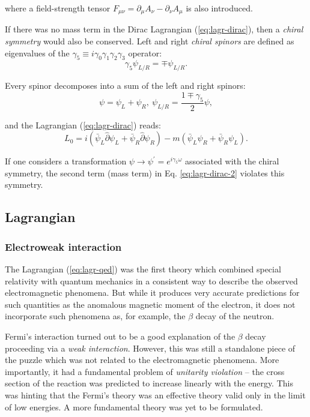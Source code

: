 where a field-strength tensor $F_{\mu\nu} = \partial_\mu A_\nu - \partial_\nu A_\mu$ is also introduced.

If there was no mass term in the Dirac Lagrangian (\ref{eq:lagr-dirac}), then a \textit{chiral symmetry} would also be conserved. Left and right \textit{chiral spinors} are defined as eigenvalues of the $\gamma_5 \equiv i\gamma_0\gamma_1\gamma_2\gamma_3$ operator:
\begin{equation}
    \gamma_5\psi_{L/R} = \mp\psi_{L/R}.
\end{equation}

Every spinor decomposes into a sum of the left and right spinors:
\begin{equation}
    \psi = \psi_L + \psi_R, ~\psi_{L/R} = \dfrac{1\mp\gamma_5}{2}\psi,
\end{equation}

and the Lagrangian (\ref{eq:lagr-dirac}) reads:
\begin{equation}\label{eq:lagr-dirac-2}
    L_0 = i(\bar{\psi}_L\hat{\partial}\psi_L + \bar{\psi}_R\hat{\partial}\psi_R) - m(\bar{\psi}_L\psi_R + \bar{\psi}_R\psi_L).
\end{equation}

If one considers a transformation $\psi \to \psi^\prime = e^{i\gamma_5\omega}$ associated with the chiral symmetry, the second term (mass term) in Eq.  \ref{eq:lagr-dirac-2} violates this symmetry.

\subsection{Lagrangian}

\subsubsection{Electroweak interaction}
The Lagrangian (\ref{eq:lagr-qed}) was the first theory which combined special relativity with quantum mechanics in a consistent way to describe the observed electromagnetic phenomena. But while it produces very accurate predictions for such quantities as the anomalous magnetic moment of the electron, it does not incorporate such phenomena as, for example, the $\beta$ decay of the neutron.

Fermi's interaction turned out to be a good explanation of the $\beta$ decay proceeding via a \textit{weak interaction}. However, this was still a standalone piece of the puzzle which was not related to the electromagnetic phenomena. More importantly, it had a fundamental problem of \textit{unitarity violation} -- the cross section of the reaction was predicted to increase linearly with the energy. This was hinting that the Fermi's theory was an effective theory valid only in the limit of low energies. A more fundamental theory was yet to be formulated.

